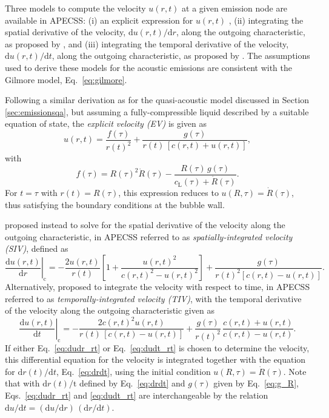 Three models to compute the velocity $u(r,t)$ at a given emission node are available in APECSS: (i) an explicit expression for $u(r,t)$ \citep{Denner2023}, (ii) integrating the spatial derivative of the velocity, $\mathrm{d}u(r,t)/\mathrm{d}r$, along the outgoing characteristic, as proposed by \citet{Gilmore1952}, and (iii) integrating the temporal derivative of the velocity, $\mathrm{d}u(r,t)/\mathrm{d}t$, along the outgoing characteristic, as proposed by \citet{Hickling1963}. The assumptions used to derive these models for the acoustic emissions are consistent with the Gilmore model, Eq.~\eqref{eq:gilmore}.

Following a similar derivation as for the quasi-acoustic model discussed in Section \ref{sec:emissionsqa}, but assuming a fully-compressible liquid described by a suitable equation of state, the {\it explicit velocity (EV)} is given as
\begin{equation}
    u(r,t) = \frac{f(\tau)}{r(t)^2} + \frac{g(\tau)}{r(t) \, [c(r,t) + u(r,t)]} , \label{eq:u_rt}
\end{equation}
with 
\begin{equation}
    f(\tau) = R(\tau)^2 \dot{R}(\tau) - \frac{R(\tau) \, g(\tau)}{c_\mathrm{L}(\tau) + \dot{R}(\tau)}  . \label{eq:f_R}
\end{equation}
For $t=\tau$ with $r(t)=R(\tau)$, this expression reduces to $u(R,\tau)=\dot{R}(\tau)$, thus satisfying the boundary conditions at the bubble wall.

\citet{Gilmore1952} proposed instead to solve for the spatial derivative of the velocity along the outgoing characteristic, in APECSS referred to as {\it spatially-integrated velocity (SIV)}, defined as 
\begin{equation}
    \left. \frac{\mathrm{d}u(r,t)}{\mathrm{d}r} \right|_\text{c} = - \frac{2 u(r,t)}{r(t)} \left[1+\frac{u(r,t)^2}{c(r,t)^2-u(r,t)^2} \right] + \frac{g(\tau)}{r(t)^2 [c(r,t)-u(r,t)]} \label{eq:dudr_rt}.
\end{equation}
Alternatively, \citet{Hickling1963} proposed to integrate the velocity with respect to time, in APECSS referred to as {\it temporally-integrated velocity (TIV)}, with the temporal derivative of the velocity along the outgoing characteristic given as
\begin{equation}
    \left. \frac{\mathrm{d}u(r,t)}{\mathrm{d}t} \right|_\text{c} =  - \frac{2 c(r,t)^2 u(r,t)}{r(t) \, [c(r,t)-u(r,t)]} + \frac{g(\tau)}{r(t)^2} \, \frac{c(r,t)+u(r,t)}{c(r,t)-u(r,t)}. \label{eq:dudt_rt}
\end{equation}
If either Eq.~\eqref{eq:dudr_rt} or Eq.~\eqref{eq:dudt_rt} is chosen to determine the velocity, this differential equation for the velocity is integrated together with the equation for ${\mathrm{d}r(t)/\mathrm{d}t}$, Eq.~\eqref{eq:drdt}, using the initial condition $u(R,\tau) = \dot{R}(\tau)$. Note that with $\mathrm{d}r(t)/\mathrm{t}$ defined by Eq.~\eqref{eq:drdt} and $g(\tau)$ given by Eq.~\eqref{eq:g_R}, Eqs.~\eqref{eq:dudr_rt} and \eqref{eq:dudt_rt} are interchangeable by the relation ${\mathrm{d}u/\mathrm{d}t} = ({\mathrm{d}u/\mathrm{d}r}) \, ({\mathrm{d}r/\mathrm{d}t})$. 

